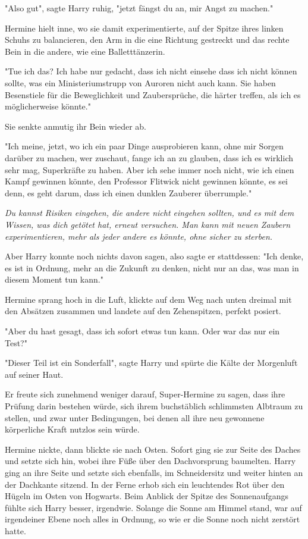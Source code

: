 {"Also gut", sagte Harry ruhig, "jetzt fängst du an, mir Angst zu machen."

Hermine hielt inne, wo sie damit experimentierte, auf der Spitze ihres linken Schuhs zu balancieren, den Arm in die eine Richtung gestreckt und das rechte Bein in die andere, wie eine Balletttänzerin.

"Tue ich das? Ich habe nur gedacht, dass ich nicht einsehe dass ich nicht können sollte, was ein Ministeriumstrupp von Auroren nicht auch kann. Sie haben Besenstiele für die Beweglichkeit und Zaubersprüche, die härter treffen, als ich es möglicherweise könnte."

Sie senkte anmutig ihr Bein wieder ab.

"Ich meine, jetzt, wo ich ein paar Dinge ausprobieren kann, ohne mir Sorgen darüber zu machen, wer zuschaut, fange ich an zu glauben, dass ich es wirklich sehr mag, Superkräfte zu haben. Aber ich sehe immer noch nicht, wie ich einen Kampf gewinnen könnte, den Professor Flitwick nicht gewinnen könnte, es sei denn, es geht darum, dass ich einen dunklen Zauberer überrumple."

\emph{Du kannst Risiken eingehen, die andere nicht eingehen sollten, und es mit dem Wissen, was dich getötet hat, erneut versuchen. Man kann mit neuen Zaubern experimentieren, mehr als jeder andere es könnte, ohne sicher zu sterben.}

Aber Harry konnte noch nichts davon sagen, also sagte er stattdessen: "Ich denke, es ist in Ordnung, mehr an die Zukunft zu denken, nicht nur an das, was man in diesem Moment tun kann."

Hermine sprang hoch in die Luft, klickte auf dem Weg nach unten dreimal mit den Absätzen zusammen und landete auf den Zehenspitzen, perfekt posiert.

"Aber du hast gesagt, dass ich sofort etwas tun kann. Oder war das nur ein Test?"

"Dieser Teil ist ein Sonderfall", sagte Harry und spürte die Kälte der Morgenluft auf seiner Haut.

Er freute sich zunehmend weniger darauf, Super-Hermine zu sagen, dass ihre Prüfung darin bestehen würde, sich ihrem buchstäblich schlimmsten Albtraum zu stellen, und zwar unter Bedingungen, bei denen all ihre neu gewonnene körperliche Kraft nutzlos sein würde.

Hermine nickte, dann blickte sie nach Osten. Sofort ging sie zur Seite des Daches und setzte sich hin, wobei ihre Füße über den Dachvorsprung baumelten. Harry ging an ihre Seite und setzte sich ebenfalls, im Schneidersitz und weiter hinten an der Dachkante sitzend. In der Ferne erhob sich ein leuchtendes Rot über den Hügeln im Osten von Hogwarts. Beim Anblick der Spitze des Sonnenaufgangs fühlte sich Harry besser, irgendwie. Solange die Sonne am Himmel stand, war auf irgendeiner Ebene noch alles in Ordnung, so wie er die Sonne noch nicht zerstört hatte.

}
